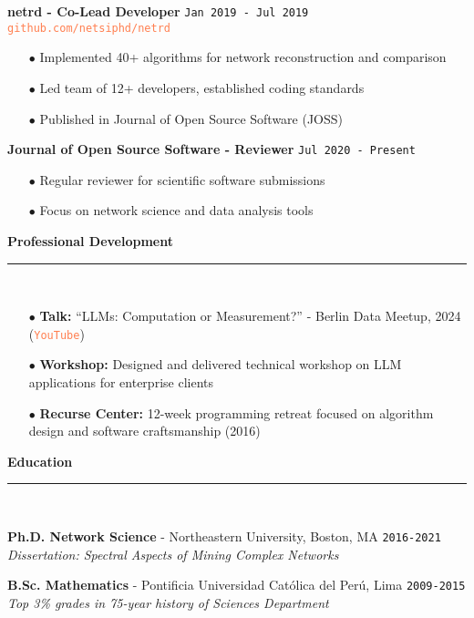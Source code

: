 \documentclass[11pt,a4paper]{article}
\newcommand{\sectiondivider}{%
    \vspace{2pt}\\%
    {\color{coral}\rule{30pt}{2pt}}\\%
    \vspace{8pt}%
}
\newcommand{\coralbullet}{{\color{coral}$\bullet$}\space}
\newcommand{\jobduration}[1]{%
    \textcolor{mediumgray}{\texttt{\small #1}}%
}
\newcommand{\cvsectioncustom}[1]{%
    \vspace{12pt}%
    {\Large\color{navy}\textbf{#1}}%
    \sectiondivider%
}
\begin{document}
\vspace{6pt}

\textbf{\large\color{navy}netrd - Co-Lead Developer} \hfill \jobduration{Jan 2019 - Jul 2019}\\
{\textcolor{coral}{\texttt{github.com/netsiphd/netrd}}}

\begin{itemize}[leftmargin=15pt,itemsep=3pt]
    \item[\coralbullet] Implemented 40+ algorithms for network reconstruction and comparison
    \item[\coralbullet] Led team of 12+ developers, established coding standards
    \item[\coralbullet] Published in Journal of Open Source Software (JOSS)
\end{itemize}

\vspace{6pt}

\textbf{\large\color{navy}Journal of Open Source Software - Reviewer} \hfill \jobduration{Jul 2020 - Present}

\begin{itemize}[leftmargin=15pt,itemsep=3pt]
    \item[\coralbullet] Regular reviewer for scientific software submissions
    \item[\coralbullet] Focus on network science and data analysis tools
\end{itemize}

\cvsectioncustom{Professional Development}

\begin{itemize}[leftmargin=15pt,itemsep=3pt]
    \item[\coralbullet] \textbf{Talk:} ``LLMs: Computation or Measurement?'' - Berlin Data Meetup, 2024 ({\textcolor{coral}{\texttt{YouTube}}})
    \item[\coralbullet] \textbf{Workshop:} Designed and delivered technical workshop on LLM applications for enterprise clients
    \item[\coralbullet] \textbf{Recurse Center:} 12-week programming retreat focused on algorithm design and software craftsmanship (2016)
\end{itemize}

\cvsectioncustom{Education}

\textbf{\large\color{navy}Ph.D. Network Science} - Northeastern University, Boston, MA \hfill \jobduration{2016-2021}\\
\textit{Dissertation: Spectral Aspects of Mining Complex Networks}

\vspace{6pt}

\textbf{\large\color{navy}B.Sc. Mathematics} - Pontificia Universidad Católica del Perú, Lima \hfill \jobduration{2009-2015}\\
\textit{Top 3\% grades in 75-year history of Sciences Department}
\end{document}
